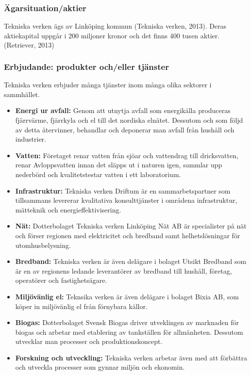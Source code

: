 \documentclass[10pt,a4paper]{article}
\begin{document}
\subsubsection{Ägarsituation/aktier}
Tekniska verken ägs av Linköping kommun (Tekniska verken, 2013). Deras
aktiekapital uppgår i 200 miljoner kronor och det finns 400 tusen
aktier.(Retriever, 2013)

\subsubsection{Erbjudande: produkter och/eller tjänster}
Tekniska verken erbjuder många tjänster inom många olika sektorer i sammhället.
\begin{itemize}
\item \textbf{Energi ur avfall:} Genom att utnytja avfall som energikälla produceras fjärrvärme, fjärrkyla och el till det nordiska elnätet. Dessutom och som följd av detta återvinner, behandlar och deponerar man avfall från hushåll och industrier.
\item \textbf{Vatten:} Företaget renar vatten från sjöar och vattendrag till dricksvatten, renar Avloppsvatten innan det släpps ut i naturen igen, sammlar upp nederbörd och kvalitetstestar vatten i ett laboratorium. 
\item \textbf{Infrastruktur:} Tekniska verken Driftum är en sammarbetspartner som tillsammans levererar kvalitativa konsulttjänster i områdena  infrastruktur, mätteknik och energieffektivisering.
\item \textbf{Nät:} Dotterbolaget Tekniska verken Linköping Nät AB är specialister på nät och förser regionen med elektricitet och bredband samt helhetslösningar för utomhusbelysning.
\item \textbf{Bredband:} Tekniska verken är även delägare i bolaget Utsikt Bredband som är en av regionens ledande leverantörer av bredband till hushåll, företag, operatörer och fastighetsägare.
\item \textbf{Miljövänlig el:} Teknsika verken är även delägare i bolaget Bixia AB, som köper in miljövänlig el från förnybara källor.
\item \textbf{Biogas:} Dotterbolaget Svensk Biogas driver utveklingen av marknaden för biogas och arbetar med etablering av tankställen för allmänheten. Dessutom utvecklar man processer och produktionskoncept.
\item \textbf{Forskning och utveckling:} Tekniska verken arbetar även med att förbättra och utveckla processer som gynnar miljön och ekonomin. 
\end{itemize}
\end{document}
